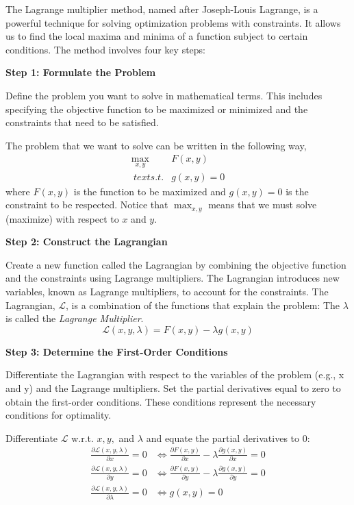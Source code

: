 \documentclass[
  12pt,
  oneside]{book}
\theoremstyle{definition}
\theoremstyle{definition}
\theoremstyle{definition}
\theoremstyle{definition}
\theoremstyle{remark}
\begin{document}
The Lagrange multiplier method, named after Joseph-Louis Lagrange,
is a powerful technique for solving optimization problems with constraints.
It allows us to find the local maxima and minima of a function subject to certain conditions.
The method involves four key steps:

\textbf{Step 1: Formulate the Problem}

Define the problem you want to solve in mathematical terms.
This includes specifying the objective function to be maximized or minimized and the constraints that need to be satisfied.

The problem that we want to solve can be written in the following way,
\[
\begin{array}{ll}
    \max _{x, y} & F(x, y) \\
    \
    text { s.t. } & g(x, y)=0
\end{array}
\]
where \(F(x, y)\) is the function to be maximized and \(g(x, y)=0\) is the constraint to be respected.
Notice that \(\max _{x, y}\) means that we must solve (maximize) with respect to \(x\) and \(y\).

\textbf{Step 2: Construct the Lagrangian}

Create a new function called the Lagrangian by combining the objective function
and the constraints using Lagrange multipliers. The Lagrangian introduces new variables,
known as Lagrange multipliers, to account for the constraints.
The Lagrangian, \(\mathcal{L}\), is a combination of the functions that explain the problem:
The \(\lambda\) is called the \emph{Lagrange Multiplier}.
\[
\mathcal{L}(x, y, \lambda)=F(x, y)-\lambda g(x, y)
\]

\textbf{Step 3: Determine the First-Order Conditions}

Differentiate the Lagrangian with respect to the variables of the problem (e.g., x and y)
and the Lagrange multipliers. Set the partial derivatives equal to zero to obtain
the first-order conditions. These conditions represent the necessary conditions for optimality.

Differentiate \(\mathcal{L}\) w.r.t. \(x, y,\) and \(\lambda\) and equate the partial derivatives to 0:
\begin{align*}
    \frac{\partial \mathcal{L}(x, y, \lambda)}{\partial x}=0 & \Leftrightarrow \frac{\partial F(x, y)}{\partial x}-\lambda \frac{\partial g(x, y)}{\partial x}=0 \\
    \frac{\partial \mathcal{L}(x, y, \lambda)}{\partial y}=0 & \Leftrightarrow \frac{\partial F(x, y)}{\partial y}-\lambda \frac{\partial g(x, y)}{\partial y}=0 \\
    \frac{\partial \mathcal{L}(x, y, \lambda)}{\partial \lambda}=0 & \Leftrightarrow g(x, y)=0
\end{align*}
\end{document}
